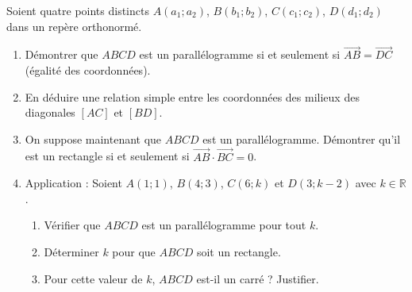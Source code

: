 \documentclass[11pt]{article}
\begin{document}
\begin{exercice}
Soient quatre points distincts $A(a_1;a_2)$, $B(b_1;b_2)$, $C(c_1;c_2)$, $D(d_1;d_2)$ dans un repère orthonormé.
\begin{enumerate}
    \item Démontrer que $ABCD$ est un parallélogramme si et seulement si $\overrightarrow{AB} = \overrightarrow{DC}$ (égalité des coordonnées).
    \item En déduire une relation simple entre les coordonnées des milieux des diagonales $[AC]$ et $[BD]$.
    \item On suppose maintenant que $ABCD$ est un parallélogramme. Démontrer qu'il est un rectangle si et seulement si $\overrightarrow{AB} \cdot \overrightarrow{BC} = 0$.
    \item Application : Soient $A(1;1)$, $B(4;3)$, $C(6;k)$ et $D(3;k-2)$ avec $k \in \mathbb{R}$.
    \begin{enumerate}
        \item Vérifier que $ABCD$ est un parallélogramme pour tout $k$.
        \item Déterminer $k$ pour que $ABCD$ soit un rectangle.
        \item Pour cette valeur de $k$, $ABCD$ est-il un carré ? Justifier.
    \end{enumerate}
\end{enumerate}
\end{exercice}
\end{document}
